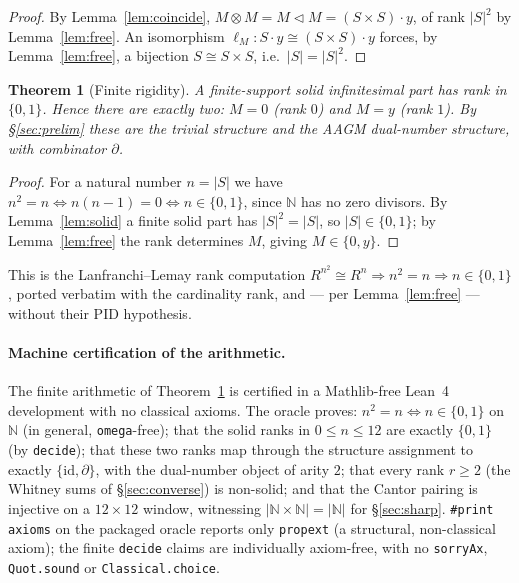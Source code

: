 \documentclass[11pt]{article}
\newtheorem{theorem}{Theorem}
\theoremstyle{definition}
\newcommand{\N}{\mathbb{N}}
\newcommand{\id}{\mathrm{id}}
\begin{document}
\begin{proof}
By Lemma~\ref{lem:coincide}, $M\otimes M=M\lhd M=(S\times S)\cdot y$, of rank $|S|^2$ by Lemma~\ref{lem:free}.
An isomorphism $\ell_M\colon S\cdot y\cong(S\times S)\cdot y$ forces, by Lemma~\ref{lem:free}, a
bijection $S\cong S\times S$, i.e.\ $|S|=|S|^2$.
\end{proof}

\begin{theorem}[Finite rigidity]\label{thm:rigidity}
A finite-support solid infinitesimal part has rank in $\{0,1\}$. Hence there are exactly two:
$M=0$ (rank $0$) and $M=y$ (rank $1$). By \S\ref{sec:prelim} these are the trivial structure and
the AAGM dual-number structure, with combinator $\partial$.
\end{theorem}

\begin{proof}
For a natural number $n=|S|$ we have $n^2=n\iff n(n-1)=0\iff n\in\{0,1\}$, since $\N$ has no zero
divisors. By Lemma~\ref{lem:solid} a finite solid part has $|S|^2=|S|$, so $|S|\in\{0,1\}$; by
Lemma~\ref{lem:free} the rank determines $M$, giving $M\in\{0,y\}$.
\end{proof}

This is the Lanfranchi--Lemay rank computation $R^{n^2}\cong R^n\Rightarrow n^2=n\Rightarrow
n\in\{0,1\}$, ported verbatim with the cardinality rank, and --- per Lemma~\ref{lem:free} --- without
their PID hypothesis.

\paragraph{Machine certification of the arithmetic.}
The finite arithmetic of Theorem~\ref{thm:rigidity} is certified in a Mathlib-free Lean~4
development with no classical axioms. The oracle proves: $n^2=n\iff n\in\{0,1\}$ on $\N$ (in
general, \texttt{omega}-free); that the solid ranks in $0\le n\le12$ are exactly $\{0,1\}$ (by
\texttt{decide}); that these two ranks map through the structure assignment to exactly $\{\id,
\partial\}$, with the dual-number object of arity $2$; that every rank $r\ge2$ (the Whitney sums
of \S\ref{sec:converse}) is non-solid; and that the Cantor pairing is injective on a
$12\times12$ window, witnessing $|\N\times\N|=|\N|$ for \S\ref{sec:sharp}. \texttt{\#print axioms}
on the packaged oracle reports only \texttt{propext} (a structural, non-classical axiom); the
finite \texttt{decide} claims are individually axiom-free, with no \texttt{sorryAx},
\texttt{Quot.sound} or \texttt{Classical.choice}.
\end{document}
